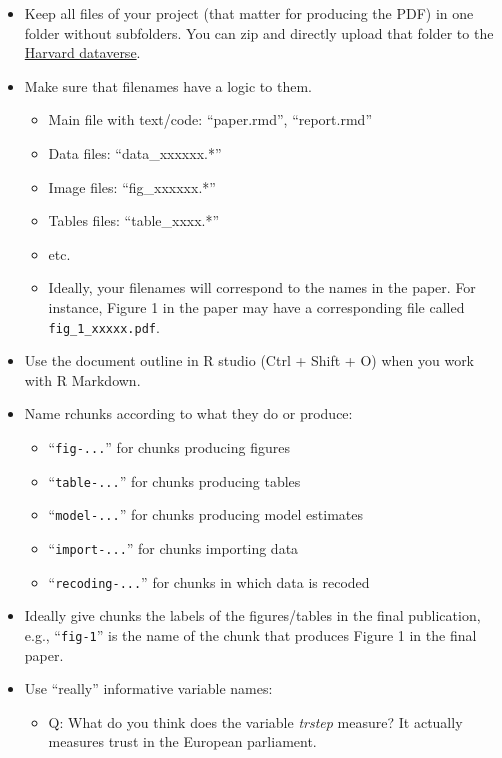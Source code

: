 \documentclass[
  12pt,
]{article}
\providecommand{\tightlist}{%
  \setlength{\itemsep}{0pt}\setlength{\parskip}{0pt}}
\begin{document}
\begin{itemize}
\tightlist
\item
  Keep all files of your project (that matter for producing the PDF) in
  one folder without subfolders. You can zip and directly upload that
  folder to the \href{https://dataverse.harvard.edu/}{Harvard
  dataverse}.
\item
  Make sure that filenames have a logic to them.

  \begin{itemize}
  \tightlist
  \item
    Main file with text/code: ``paper.rmd'', ``report.rmd''
  \item
    Data files: ``data\_xxxxxx.*''
  \item
    Image files: ``fig\_xxxxxx.*''
  \item
    Tables files: ``table\_xxxx.*''
  \item
    etc.
  \item
    Ideally, your filenames will correspond to the names in the paper.
    For instance, Figure 1 in the paper may have a corresponding file
    called \texttt{fig\_1\_xxxxx.pdf}.
  \end{itemize}
\item
  Use the document outline in R studio (Ctrl + Shift + O) when you work
  with R Markdown.
\item
  Name rchunks according to what they do or produce:

  \begin{itemize}
  \tightlist
  \item
    ``\texttt{fig-...}'' for chunks producing figures
  \item
    ``\texttt{table-...}'' for chunks producing tables
  \item
    ``\texttt{model-...}'' for chunks producing model estimates
  \item
    ``\texttt{import-...}'' for chunks importing data
  \item
    ``\texttt{recoding-...}'' for chunks in which data is recoded
  \end{itemize}
\item
  Ideally give chunks the labels of the figures/tables in the final
  publication, e.g., ``\texttt{fig-1}'' is the name of the chunk that
  produces Figure 1 in the final paper.
\item
  Use ``really'' informative variable names:

  \begin{itemize}
  \tightlist
  \item
    Q: What do you think does the variable \emph{trstep} measure? It
    actually measures trust in the European parliament.


\end{itemize}
\end{itemize}
\end{document}
